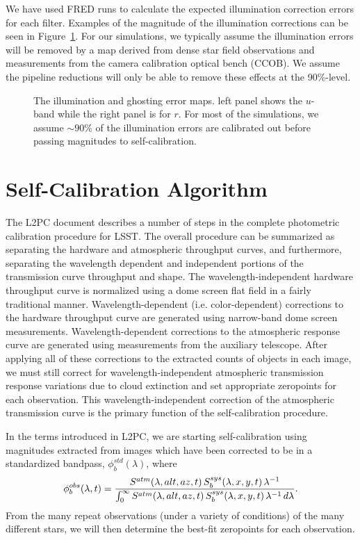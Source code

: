 \documentclass[12pt,preprint]{aastex}
\begin{document}
We have used FRED runs to calculate the expected illumination correction errors for each filter.  Examples of the magnitude of the illumination corrections can be seen in Figure~\ref{fig:illum}.  For our simulations, we typically assume the illumination errors will be removed by a map derived from dense star field observations and measurements from the camera calibration optical bench (CCOB).  We assume the pipeline reductions will only be able to remove these effects at the 90\%-level.  

\begin{figure}
\caption{The illumination and ghosting error maps.  left panel shows
the $u$-band while the right panel is for $r$. For most of the simulations, we assume $\sim90$\% of the illumination errors are calibrated out before passing magnitudes to self-calibration.  \label{fig:illum}}
\end{figure}


\section{Self-Calibration Algorithm}\label{alg}


The L2PC document describes a number of steps in the complete
photometric calibration procedure for LSST. The overall procedure can
be summarized as separating the hardware and atmospheric throughput
curves, and furthermore, separating the wavelength dependent and
independent portions of the transmission curve throughput and
shape. The wavelength-independent hardware throughput curve is
normalized using a dome screen flat field in a fairly traditional
manner. Wavelength-dependent (i.e. color-dependent) corrections to the
hardware throughput curve are generated using narrow-band dome screen
measurements. Wavelength-dependent corrections to the atmospheric
response curve are generated using measurements from the auxiliary
telescope. After applying all of these corrections to the extracted
counts of objects in each image, we must still correct for
wavelength-independent atmospheric transmission response variations
due to cloud extinction and set appropriate zeropoints for each
observation. This wavelength-independent correction of the
atmospheric transmission curve is the primary function of the
self-calibration procedure.


In the terms introduced in L2PC, we are starting self-calibration
using magnitudes extracted from images which have been corrected to be
in a standardized bandpass, $\phi_b^{std}(\lambda)$, where
\begin{equation}
\label{eqn:PhiDef}
	   \phi_b^{obs}(\lambda,t) =  {
	     {S^{atm}(\lambda,alt,az,t)\, S_b^{sys}(\lambda,x,y,t) \,
	       \lambda^{-1}} \over
	     \int_0^\infty { {S^{atm}(\lambda,alt,az,t) \,
	         S_b^{sys}(\lambda,x,y,t) \, \lambda^{-1}} \,d\lambda}}.  
\end{equation}
From the many repeat observations (under a variety of conditions) of the many different stars, we will then determine the best-fit zeropoints for each observation.
\end{document}

